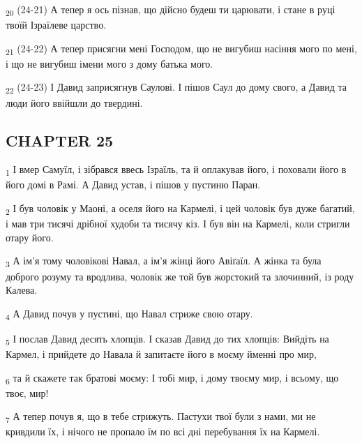 \begin{tcolorbox}
\textsubscript{20} (24-21) А тепер я ось пізнав, що дійсно будеш ти царювати, і стане в руці твоїй Ізраїлеве царство.
\end{tcolorbox}
\begin{tcolorbox}
\textsubscript{21} (24-22) А тепер присягни мені Господом, що не вигубиш насіння мого по мені, і що не вигубиш імени мого з дому батька мого.
\end{tcolorbox}
\begin{tcolorbox}
\textsubscript{22} (24-23) І Давид заприсягнув Саулові. І пішов Саул до дому свого, а Давид та люди його ввійшли до твердині.
\end{tcolorbox}
\subsection{CHAPTER 25}
\begin{tcolorbox}
\textsubscript{1} І вмер Самуїл, і зібрався ввесь Ізраїль, та й оплакував його, і поховали його в його домі в Рамі. А Давид устав, і пішов у пустиню Паран.
\end{tcolorbox}
\begin{tcolorbox}
\textsubscript{2} І був чоловік у Маоні, а оселя його на Кармелі, і цей чоловік був дуже багатий, і мав три тисячі дрібної худоби та тисячу кіз. І був він на Кармелі, коли стригли отару його.
\end{tcolorbox}
\begin{tcolorbox}
\textsubscript{3} А ім'я тому чоловікові Навал, а ім'я жінці його Авіґаїл. А жінка та була доброго розуму та вродлива, чоловік же той був жорстокий та злочинний, із роду Калева.
\end{tcolorbox}
\begin{tcolorbox}
\textsubscript{4} А Давид почув у пустині, що Навал стриже свою отару.
\end{tcolorbox}
\begin{tcolorbox}
\textsubscript{5} І послав Давид десять хлопців. І сказав Давид до тих хлопців: Вийдіть на Кармел, і прийдете до Навала й запитаєте його в моєму йменні про мир,
\end{tcolorbox}
\begin{tcolorbox}
\textsubscript{6} та й скажете так братові моєму: І тобі мир, і дому твоєму мир, і всьому, що твоє, мир!
\end{tcolorbox}
\begin{tcolorbox}
\textsubscript{7} А тепер почув я, що в тебе стрижуть. Пастухи твої були з нами, ми не кривдили їх, і нічого не пропало їм по всі дні перебування їх на Кармелі.
\end{tcolorbox}
